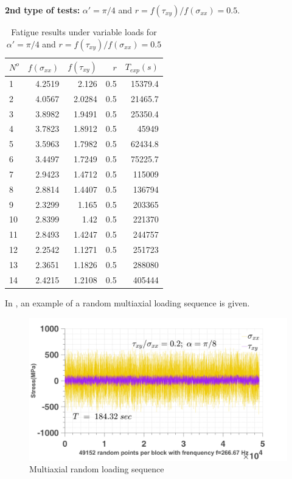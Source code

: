 \textbf{2nd type of tests:} $\alpha' = \pi / 4$ and $r =f(\tau_{xy})/f(\sigma_{xx})=0.5$.

\begin{table}[]
\centering
\begin{tabular}{lrrrr}
\hline
$N^o$ & $f(\sigma_{xx})$ & $f(\tau_{xy})$ & $r$   & $T_{exp}(s)$ \\ \hline
1   & 4.2519                  & 2.126   & 0.5 & 15379.4    \\
2   & 4.0567                  & 2.0284  & 0.5 & 21465.7    \\
3   & 3.8982                  & 1.9491  & 0.5 & 25350.4    \\
4   & 3.7823                  & 1.8912  & 0.5 & 45949      \\
5   & 3.5963                  & 1.7982  & 0.5 & 62434.8    \\
6   & 3.4497                  & 1.7249  & 0.5 & 75225.7    \\
7   & 2.9423                  & 1.4712  & 0.5 & 115009     \\
8   & 2.8814                  & 1.4407  & 0.5 & 136794     \\
9   & 2.3299                  & 1.165   & 0.5 & 203365     \\
10  & 2.8399                  & 1.42    & 0.5 & 221370     \\
11  & 2.8493                  & 1.4247  & 0.5 & 244757     \\
12  & 2.2542                  & 1.1271  & 0.5 & 251723     \\
13  & 2.3651                  & 1.1826  & 0.5 & 288080     \\
14  & 2.4215                  & 1.2108  & 0.5 & 405444     \\ \hline
\end{tabular}
\caption{Fatigue results under variable loads for $\alpha' = \pi / 4$ and $r =f(\tau_{xy})/f(\sigma_{xx})=0.5$}
\label{tab.10HNAPrand2}
\end{table}

In , an example of a random multiaxial loading sequence is given.
\begin{figure}[!h]
\centering
\includegraphics[width=\textwidth]{figures//HNAP_random.png} 
\caption{Multiaxial random loading sequence}
\label{fig.10HNAP2Drandom}
\end{figure}

